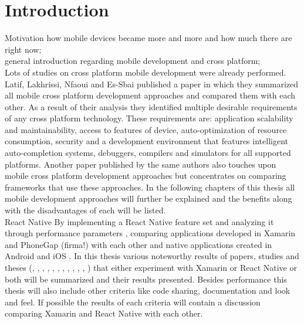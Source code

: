 \documentclass[Bachelor,BIF,english]{twbook}
\begin{document}
\chapter{Introduction}
Motivation how mobile devices became more and more and how much there are right now; 
\\[\baselineskip]
general introduction regarding mobile development and cross platform; 
\\[\baselineskip]
Lots of studies on cross platform mobile development were already performed. Latif, Lakhrissi, Nfaoui and Es-Sbai published a paper \cite{7479278} in which they summarized all mobile cross platform development approaches and compared them with each other. As a result of their analysis they identified multiple desirable requirements of any cross platform technology. These requirements are: application scalability and maintainability, access to features of device, auto-optimization of resource consumption, security and a development environment that features intelligent auto-completion systems, debuggers, compilers and simulators for all supported platforms. Another paper \cite{7934674} published by the same authors also touches upon mobile cross platform development approaches but concentrates on comparing frameworks that use these approaches. In the following chapters of this thesis all mobile development approaches will further be explained and the benefits along with the disadvantages of each will be listed.
\\[\baselineskip]
React Native By implementing a React Native feature set and analyzing it through performance parameters \cite{JohanssonSderberg2018}, comparing applications developed in Xamarin and PhoneGap (firma!) with each other and native applications created in Android and iOS \cite{Armgren_2015}. In this thesis various noteworthy results of papers, studies and theses (\cite{Danielsson_2016}, \cite{Axelsson2016}, \cite{Hansson_Vidhall_2016}, \cite{MartinezLecomte2018}, \cite{ZubaBernhard2017EdPb}, \cite{WillocxVossaertNaessens2015}, \cite{MartinezLecomte2017}, \cite{Dickson_2013}, \cite{GaouarBenamarBendimerad2016}, \cite{7479278}, \cite{LinckArne2016}, \cite{7934674}) that either experiment with Xamarin or React Native or both will be summarized and their results presented. Besides performance this thesis will also include other criteria like code sharing, documentation and look and feel. If possible the results of each criteria will contain a discussion comparing Xamarin and React Native with each other. 
\end{document}
